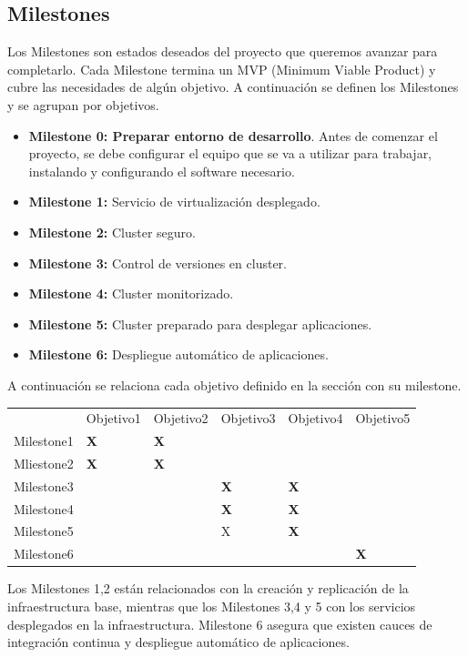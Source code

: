 	\subsection{Milestones}
		\begin{text}
			Los Milestones son estados deseados del proyecto que queremos avanzar para completarlo. Cada Milestone termina un MVP (Minimum Viable Product) y cubre las necesidades de algún objetivo. A continuación se definen los Milestones y se agrupan por objetivos.
			
			\begin{itemize}
				\item \textbf{Milestone 0: Preparar entorno de desarrollo}. Antes de comenzar el proyecto, se debe configurar el equipo que se va a utilizar para trabajar, instalando y configurando el software necesario. 
				\item \textbf{Milestone 1:} Servicio de virtualización desplegado. 
				\item \textbf{Milestone 2:} Cluster seguro.
				\item \textbf{Milestone 3:} Control de versiones en cluster.
				\item \textbf{Milestone 4:} Cluster monitorizado.
				\item \textbf{Milestone 5:} Cluster preparado para desplegar aplicaciones.
				\item \textbf{Milestone 6:} Despliegue automático de aplicaciones.
			\end{itemize}
			A continuación se relaciona cada objetivo definido en la sección  con su milestone.
			
		
		\begin{table}[!hbt]
			\begin{tabular}{llllll}
				& Objetivo1         & Objetivo2         & Objetivo3         & Objetivo4         & Objetivo5         \\
				Milestone1 & \textbf{X} & \textbf{X} & \textbf{}  &            &            \\
				Mliestone2 & \textbf{X} & \textbf{X} &            &            &            \\
				Milestone3 &            &            & \textbf{X} & \textbf{X} &            \\
				Milestone4 &            &            & \textbf{X} & \textbf{X} &            \\
				Milestone5 &            &            & X          & \textbf{X} &            \\
				Milestone6 &            &            &            &            & \textbf{X}
			\end{tabular}
		\end{table}
	
		Los Milestones 1,2 están relacionados con la creación y replicación de la infraestructura base, mientras que los Milestones 3,4 y 5 con los servicios desplegados en la infraestructura. Milestone 6 asegura que existen cauces de integración continua y despliegue automático de aplicaciones.
			
		\end{text}

